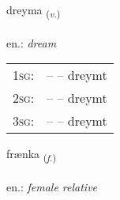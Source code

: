 \documentclass[frontgrid, backgrid]{flacards}\usepackage[]{graphicx}\usepackage[]{xcolor}
\begin{document}
\renewcommand{\flhead}{\vskip5pt \fboxsep=0pt {\small\bfseries\footnotesize Sagnorð | Verb}}
\renewcommand{\fcfoot}{\vskip5pt \fboxsep=0pt \hspace{2pt}{\small\bfseries\footnotesize 2K}}

\renewcommand{\blhead}{\vskip5pt {\small\bfseries\footnotesize Sagnorð | Verb }}
\renewcommand{\bcfoot}{\vskip5pt \hspace{2pt}{\small\bfseries\footnotesize 2K}}


{dreyma \small{\textsubscript{(\textit{v.})}} \\[1ex] %
\textphonetic{[treiːma]} \\
en.: \emph{dream} \\  [2ex]
\renewcommand*{\arraystretch}{0.8}
\begin{tabular}{p{1cm}l}
\textsc{1sg}: &  --  -- dreymt \\ 
\textsc{2sg}: &  --  -- dreymt \\ 
\textsc{3sg}: &  --  -- dreymt \\ 
\end{tabular}
}

\renewcommand{\flhead}{\vskip5pt \fboxsep=0pt {\small\bfseries\footnotesize Nafnorð | Noun}}
\renewcommand{\fcfoot}{\vskip5pt \fboxsep=0pt \hspace{2pt}{\small\bfseries\footnotesize 2K}}

\renewcommand{\blhead}{\vskip5pt {\small\bfseries\footnotesize Nafnorð | Noun }}
\renewcommand{\bcfoot}{\vskip5pt \hspace{2pt}{\small\bfseries\footnotesize 2K}}


{frænka \small{\textsubscript{(\textit{f.})}} \\[1ex] %
\textphonetic{[fraiŋ̥ka]} \\
en.: \emph{female relative} \\  [2ex]
\renewcommand*{\arraystretch}{0.8}
}
\end{document}
